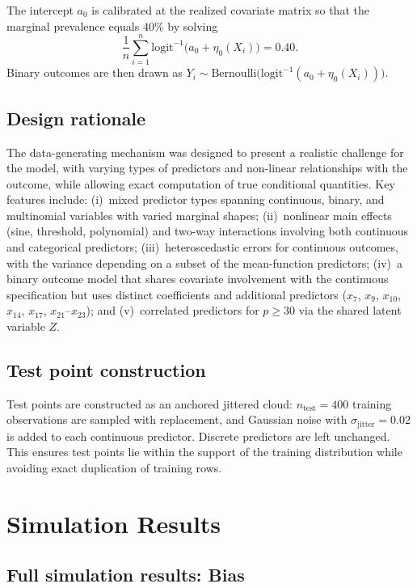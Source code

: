 \documentclass[11pt]{article}
\theoremstyle{plain}
\theoremstyle{definition}
\theoremstyle{remark}
\begin{document}
The intercept $a_0$ is calibrated at the realized covariate matrix so that the marginal prevalence equals $40\%$ by solving
\[
\frac{1}{n}\sum_{i=1}^n \mathrm{logit}^{-1}\!\bigl(a_0 + \eta_0(X_i)\bigr) = 0.40.
\]
Binary outcomes are then drawn as $Y_i \sim \mathrm{Bernoulli}\!\bigl(\mathrm{logit}^{-1}(a_0 + \eta_0(X_i))\bigr)$.

\subsection*{Design rationale}

The data-generating mechanism was designed to present a realistic challenge for the model, with varying types of predictors and non-linear relationships with the outcome, while allowing exact computation of true conditional quantities. Key features include: (i)~mixed predictor types spanning continuous, binary, and multinomial variables with varied marginal shapes; (ii)~nonlinear main effects (sine, threshold, polynomial) and two-way interactions involving both continuous and categorical predictors; (iii)~heteroscedastic errors for continuous outcomes, with the variance depending on a subset of the mean-function predictors; (iv)~a binary outcome model that shares covariate involvement with the continuous specification but uses distinct coefficients and additional predictors ($x_7$, $x_9$, $x_{10}$, $x_{14}$, $x_{17}$, $x_{21}$--$x_{23}$); and (v)~correlated predictors for $p \geq 30$ via the shared latent variable $Z$.

\subsection*{Test point construction}

Test points are constructed as an anchored jittered cloud: $n_{\mathrm{test}} = 400$ training observations are sampled with replacement, and Gaussian noise with $\sigma_{\mathrm{jitter}} = 0.02$ is added to each continuous predictor. Discrete predictors are left unchanged. This ensures test points lie within the support of the training distribution while avoiding exact duplication of training rows.

\newpage 

\section{Simulation Results}

\subsection{Full simulation results: Bias}
\label{app:tables}
\end{document}
